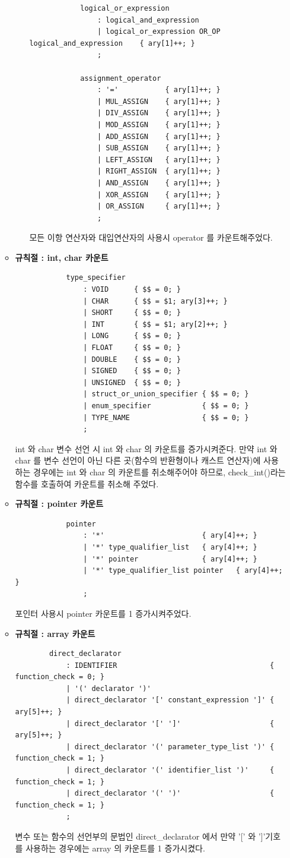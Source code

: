\documentclass{article}
\begin{document}
\begin{itemize}
\begin{itemize}
\begin{itemize}
\begin{lstlisting}
			logical_or_expression
				: logical_and_expression
				| logical_or_expression OR_OP logical_and_expression	{ ary[1]++; }
				;

			assignment_operator
				: '='			{ ary[1]++; }
				| MUL_ASSIGN	{ ary[1]++; }
				| DIV_ASSIGN	{ ary[1]++; }
				| MOD_ASSIGN	{ ary[1]++; }
				| ADD_ASSIGN	{ ary[1]++; }
				| SUB_ASSIGN	{ ary[1]++; }
				| LEFT_ASSIGN	{ ary[1]++; }
				| RIGHT_ASSIGN	{ ary[1]++; }
				| AND_ASSIGN	{ ary[1]++; }
				| XOR_ASSIGN	{ ary[1]++; }
				| OR_ASSIGN		{ ary[1]++; }
				;
			\end{lstlisting}
			모든 이항 연산자와 대입연산자의 사용시 operator 를 카운트해주었다.
		\end{itemize}

		\item {\bf 규칙절 : int, char 카운트}
		\begin{lstlisting}
			type_specifier
				: VOID		{ $$ = 0; }
				| CHAR		{ $$ = $1; ary[3]++; }
				| SHORT		{ $$ = 0; }
				| INT		{ $$ = $1; ary[2]++; }
				| LONG		{ $$ = 0; }
				| FLOAT		{ $$ = 0; }
				| DOUBLE	{ $$ = 0; }
				| SIGNED	{ $$ = 0; }
				| UNSIGNED	{ $$ = 0; }
				| struct_or_union_specifier	{ $$ = 0; }
				| enum_specifier			{ $$ = 0; }
				| TYPE_NAME					{ $$ = 0; }
				;
		\end{lstlisting}
		int 와 char 변수 선언 시 int 와 char 의 카운트를 증가시켜준다.
		만약 int 와 char 를 변수 선언이 아닌 다른 곳(함수의 반환형이나 캐스트 연산자)에
		사용하는 경우에는 int 와 char 의 카운트를 취소해주어야 하므로, check\_int()라는
		함수를 호출하여 카운트를 취소해 주었다. 

		\item {\bf 규칙절 : pointer 카운트}
		\begin{lstlisting}
			pointer
				: '*'						{ ary[4]++; }
				| '*' type_qualifier_list	{ ary[4]++; }
				| '*' pointer				{ ary[4]++; }
				| '*' type_qualifier_list pointer	{ ary[4]++; }
				;
		\end{lstlisting}
		포인터 사용시 pointer 카운트를 1 증가시켜주었다.

		\item {\bf 규칙절 : array 카운트}
		\begin{lstlisting}
		direct_declarator
			: IDENTIFIER									{ function_check = 0; }
			| '(' declarator ')'		
			| direct_declarator '[' constant_expression ']'	{ ary[5]++; }
			| direct_declarator '[' ']'						{ ary[5]++; }
			| direct_declarator '(' parameter_type_list ')' { function_check = 1; }
			| direct_declarator '(' identifier_list ')'		{ function_check = 1; }
			| direct_declarator '(' ')'						{ function_check = 1; }
			;
		\end{lstlisting}
		변수 또는 함수의 선언부의 문법인 direct\_declarator 에서 만약 '[' 와 ']'기호를 사용하는 경우에는
		array 의 카운트를 1 증가시켰다.


\end{itemize}
\end{itemize}
\end{document}

